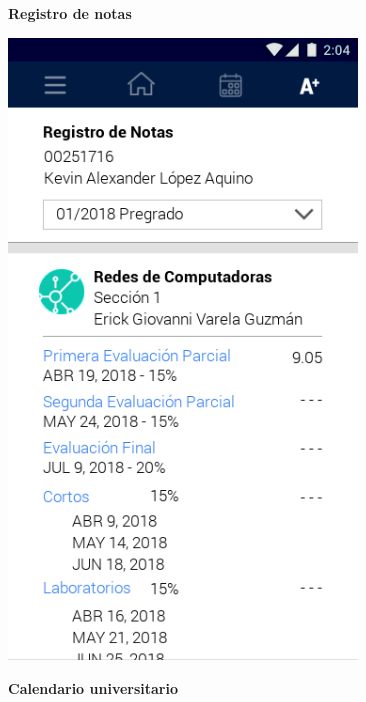 \documentclass[12pt]{article}
\begin{document}
\begin{figure}[t]
	\centering
	\begin{minipage}[t]{0.45\textwidth}
		\centering
		\caption{\textbf{Registro de notas}}
		\label{fig:consultaNotas}
		\includegraphics[width=0.825\textwidth]{img/6.png}
	\end{minipage}\hfill
	\begin{minipage}[t]{0.45\textwidth}
		\centering
		\caption{\textbf{Calendario universitario}}

\end{minipage}
\end{figure}
\end{document}
